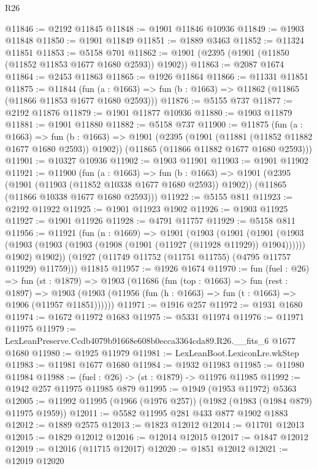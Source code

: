 \begin{lexlean}{R26}
\begin{coremodule}
@11846 := @2192 @11845
@11848 := @1901 @11846 @10936
@11849 := @1903 @11848
@11850 := @1901 @11849
@11851 := @1889 @3463
@11852 := @11324 @11851
@11853 := @5158 @701
@11862 := @1901 (@2395 (@1901 (@11850 (@11852 @11853 @1677 @1680 @2593)) @1902))
@11863 := @2087 @1674
@11864 := @2453 @11863
@11865 := @1926 @11864
@11866 := @11331 @11851
@11875 := @11844
    (fun (a : @1663) => fun (b : @1663) => @11862 (@11865 (@11866 @11853 @1677 @1680 @2593)))
@11876 := @5155 @737
@11877 := @2192 @11876
@11879 := @1901 @11877 @10936
@11880 := @1903 @11879
@11881 := @1901 @11880
@11882 := @5158 @737
@11900 := @11875
    (fun (a : @1663) =>
    fun (b : @1663) =>
    @1901
      (@2395 (@1901 (@11881 (@11852 @11882 @1677 @1680 @2593)) @1902))
      (@11865 (@11866 @11882 @1677 @1680 @2593)))
@11901 := @10327 @10936
@11902 := @1903 @11901
@11903 := @1901 @11902
@11921 := @11900
    (fun (a : @1663) =>
    fun (b : @1663) =>
    @1901
      (@2395 (@1901 (@11903 (@11852 @10338 @1677 @1680 @2593)) @1902))
      (@11865 (@11866 @10338 @1677 @1680 @2593)))
@11922 := @5155 @811
@11923 := @2192 @11922
@11925 := @1901 @11923 @1902
@11926 := @1903 @11925
@11927 := @1901 @11926
@11928 := @4791 @11757
@11929 := @5158 @811
@11956 := @11921
    (fun (n : @1669) =>
    @1901
      (@1903
        (@1901
          (@1901
            (@1903 (@1903 (@1903 (@1903 (@1908 (@1901 (@11927 (@11928 @11929)) @1904))))))
            @1902)
          @1902))
      (@1927 (@11749 @11752 (@11751 @11755) (@4795 @11757 @11929) @11759)))
    @11815
@11957 := @1926 @1674
@11970 := fun (fuel : @26) =>
  fun (st : @1879) =>
  @1903
    (@11686
      (fun (top : @1663) =>
      fun (rest : @1897) =>
      @1903 (@1903 (@11956 (fun (h : @1663) => fun (t : @1663) => @1906 (@11957 @11851))))))
@11971 := @1916 @257
@11972 := @1931 @1680
@11974 := @1672 @11972 @1683
@11975 := @5331 @11974
@11976 := @11971 @11975
@11979 := LexLeanPreserve.Ccdb4079b91668e608b0ecca3364cda89.R26.__fits_6 @1677 @1680
@11980 := @1925 @11979
@11981 := LexLeanBoot.LexiconLre.wkStep
@11983 := @11981 @1677 @1680
@11984 := @1932 @11983
@11985 := @11980 @11984
@11988 := (fuel : @26) -> (st : @1879) -> @11976 @11985
@11992 := @1942 @257 @11975 @11985 @879
@11995 := @1949 (@1953 @11972) @5363
@12005 := @11992 @11995 (@1966 (@1976 @257)) (@1982 (@1983 (@1984 @879) @11975 @1959))
@12011 := @5582 @11995 @281 @433 @877 @1902 @1883
@12012 := @1889 @2575
@12013 := @1823 @12012
@12014 := @11701 @12013
@12015 := @1829 @12012
@12016 := @12014 @12015
@12017 := @1847 @12012
@12019 := @12016 (@11715 @12017)
@12020 := @1851 @12012
@12021 := @12019 @12020

\end{coremodule}
\end{lexlean}
